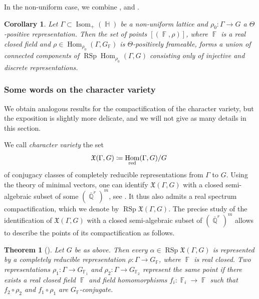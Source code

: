 \documentclass{amsart}
\theoremstyle{plain}
\newtheorem{theorem}[proposition]{Theorem}
\newtheorem{corollary}[proposition]{Corollary}
\theoremstyle{definition}
\DeclareMathOperator{\Hom}{Hom}
\DeclareMathOperator{\Isom}{Isom}
\DeclareMathOperator{\rsp}{RSp}
\DeclareMathOperator{\RSp}{RSp}
\DeclareMathOperator{\Fb}{{\mathbb{F}}}
\DeclareMathOperator{\Hb}{\mathbb{H}}
\DeclareMathOperator{\Qb}{\mathbb{Q}}
\newcommand*\from{\colon}
\newcommand{\red}{\textnormal{red}}
\newcommand{\1}{\mathbf{1}}
\begin{document}
In the non-uniform case, we combine ,   and .
\begin{corollary}
\label{rem:connected components of positive representations non uniform lattice}
    Let $\Gamma\subset \Isom_+(\Hb)$ be a non-uniform lattice and $\rho_0 \colon \Gamma \to G$ a $\Theta$-positive representation.
    Then the set of points $[(\Fb,\rho)]$, where $\Fb$ is a real closed field and $\rho\in \Hom_{\rho_0}(\Gamma, G_{\Fb})$ is $\Theta$-positively frameable, forms a union of connected components of $\rsp\Hom_{\rho_0}(\Gamma, G)$ consisting only of injective and discrete representations.
\end{corollary}

\subsubsection{Some words on the character variety}
    We obtain analogous results for the compactification of the character variety, but the exposition is slightly more delicate, and we will not give as many details in this section.

    We call \emph{character variety} the set
    \[\mathfrak{X}(\Gamma,G) \coloneqq \Hom_\red(\Gamma,G)/G~\]
    of conjugacy classes of completely reducible representations from $\Gamma$ to $G$. Using the theory of minimal vectors, one can identify $\mathfrak{X}(\Gamma,G)$ with a closed semi-algebraic subset of some $(\overline{\Qb}^r)^m$, see \cite[Propositiom 7.4]{BurgerIozziParreauPozzetti_RSCCharacterVarieties2}.
    It thus also admits a real spectrum compactification, which we denote by $\RSp\mathfrak{X}(\Gamma,G)$.
    The precise study of the identification of $\mathfrak{X}(\Gamma,G)$ with a closed semi-algebraic subset of $(\overline{\Qb}^r)^m$ allows to describe the points of its compactification as follows.
    
    \begin{theorem}[{\cite[Theorem 1.1]{BurgerIozziParreauPozzetti_RSCCharacterVarieties2}}]
    \label{thm_RSCCharBoundary character variety}
    Let $G$ be as above.
    Then every $\alpha \in \rsp\mathfrak{X}(\Gamma,G)$ is represented by a completely reducible representation $\rho \colon \Gamma \to G_{\Fb}$, where $\Fb$ is real closed.
    Two representations $\rho_1 \from \Gamma \to G_{\Fb_1}$ and $\rho_2 \from \Gamma \to G_{\Fb_2}$ represent the same point if there exists a real closed field $\Fb$ and field homomorphisms $f_i \from \Fb_{i} \to \Fb$ such that $f_2 \circ \rho_2$ and $f_1 \circ \rho_1$ are $G_{\Fb}$-conjugate.
\end{theorem}
\end{document}
